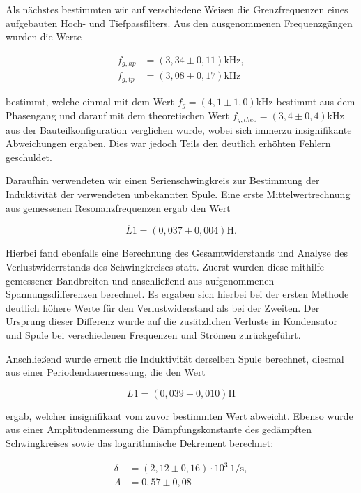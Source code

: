 \documentclass{article}
\begin{document}
Als nächstes bestimmten wir auf verschiedene Weisen die Grenzfrequenzen eines aufgebauten Hoch- und Tiefpassfilters. Aus den ausgenommenen Frequenzgängen wurden die Werte

\begin{equation}
    \begin{split}
        {f_{g,hp}} &= {(3,34 \pm 0,11)} \text{kHz}, \\
        {f_{g,tp}} &= {(3,08 \pm 0,17)} \text{kHz}
    \end{split}
\end{equation}

bestimmt, welche einmal mit dem Wert $f_g = (4,1 \pm 1,0)$kHz bestimmt aus dem Phasengang und darauf mit dem theoretischen Wert $f_{g,theo} = (3,4 \pm 0,4)$kHz aus der Bauteilkonfiguration verglichen wurde, wobei sich immerzu insignifikante Abweichungen ergaben. Dies war jedoch Teils den deutlich erhöhten Fehlern geschuldet. 

Daraufhin verwendeten wir einen Serienschwingkreis zur Bestimmung der Induktivität der verwendeten unbekannten Spule. Eine erste Mittelwertrechnung aus gemessenen Resonanzfrequenzen ergab den Wert 

\begin{equation}
    {\overline{L}1 = (0,037 \pm 0,004)} \text{H}.
\end{equation}

Hierbei fand ebenfalls eine Berechnung des Gesamtwiderstands und Analyse des Verlustwiderrstands des Schwingkreises statt. Zuerst wurden diese mithilfe gemessener Bandbreiten und anschließend aus aufgenommenen Spannungsdifferenzen berechnet. Es ergaben sich hierbei bei der ersten Methode deutlich höhere Werte für den Verlustwiderstand als bei der Zweiten. Der Ursprung dieser Differenz wurde auf die zusätzlichen Verluste in Kondensator und Spule bei verschiedenen Frequenzen und Strömen zurückgeführt.

Anschließend wurde erneut die Induktivität derselben Spule berechnet, diesmal aus einer Periodendauermessung, die den Wert 

\begin{equation}
    {L1 = (0,039 \pm 0,010)}\text{H}
\end{equation}

ergab, welcher insignifikant vom zuvor bestimmten Wert abweicht. Ebenso wurde aus einer Amplitudenmessung die Dämpfungskonstante des gedämpften Schwingkreises sowie das logarithmische Dekrement berechnet:

\begin{equation}
    \begin{split}
        \delta &= (2,12 \pm 0,16) \cdot 10^{3} \ \text{1/s}, \\
        \Lambda &= 0,57 \pm 0,08
    \end{split}
\end{equation}
\end{document}
